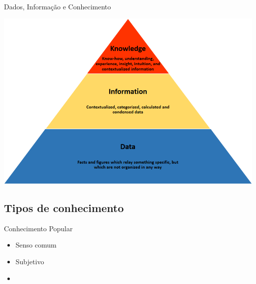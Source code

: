 \documentclass{beamer}
\begin{document}
\begin{frame}{Dados, Informação e Conhecimento}
  \begin{center}
    \includegraphics[height=0.9\textheight]{Knowledge_pyramid}
  \end{center}
\end{frame}


\subsection{Tipos de conhecimento}


\begin{frame}{Conhecimento Popular}
  \begin{itemize}
  \item Senso comum
  \item Subjetivo
  \item 
  \end{itemize}
\end{frame}
\end{document}
